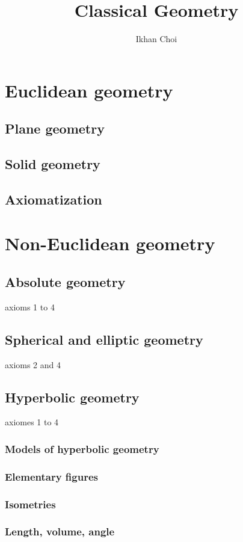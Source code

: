 \documentclass{../../large}
\begin{document}
\title{Classical Geometry}
\author{Ikhan Choi}
\maketitle
\tableofcontents

\part{Euclidean geometry}
\chapter{Plane geometry}
\chapter{Solid geometry}
\chapter{Axiomatization}

\part{Non-Euclidean geometry}
\chapter{Absolute geometry}
axioms 1 to 4
\chapter{Spherical and elliptic geometry}
axioms 2 and 4
\chapter{Hyperbolic geometry}
axiomes 1 to 4
\section{Models of hyperbolic geometry}
\section{Elementary figures}
\section{Isometries}
\section{Length, volume, angle}
\end{document}
